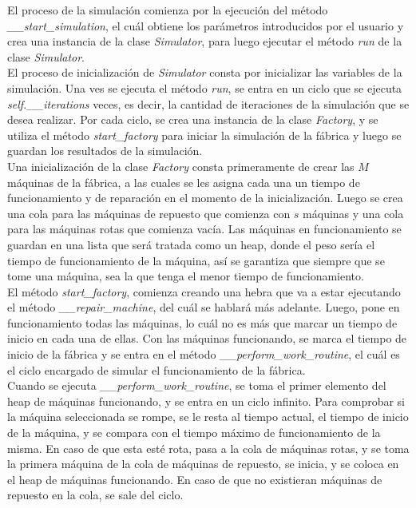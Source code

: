\documentclass{article}
\begin{document}
El proceso de la simulación comienza por la ejecución del método \textit{\_\_start\_simulation}, el cuál obtiene los parámetros introducidos por el usuario y crea una instancia de la clase \textit{Simulator}, para luego ejecutar el método \textit{run} de la clase \textit{Simulator}.\\

El proceso de inicialización de \textit{Simulator} consta por inicializar las variables de la simulación. Una ves se ejecuta el método \textit{run}, se entra en un ciclo que se ejecuta \textit{self.\_\_iterations} veces, es decir, la cantidad de iteraciones de la simulación que se desea realizar. Por cada ciclo, se crea una instancia de la clase \textit{Factory}, y se utiliza el método \textit{start\_factory} para iniciar la simulación de la fábrica y luego se guardan los resultados de la simulación.\\

Una inicialización de la clase \textit{Factory} consta primeramente de crear las $M$ máquinas de la fábrica, a las cuales se les asigna cada una un tiempo de funcionamiento y de reparación en el momento de la inicialización. Luego se crea una cola para las máquinas de repuesto que comienza con $s$ máquinas y una cola para las máquinas rotas que comienza vacía. Las máquinas en funcionamiento se guardan en una lista que será tratada como un heap, donde el peso sería el tiempo de funcionamiento de la máquina, así se garantiza que siempre que se tome una máquina, sea la que tenga el menor tiempo de funcionamiento.\\

El método \textit{start\_factory}, comienza creando una hebra que va a estar ejecutando el método \textit{\_\_repair\_machine}, del cuál se hablará más adelante. Luego, pone en funcionamiento todas las máquinas, lo cuál no es más que marcar un tiempo de inicio en cada una de ellas. Con las máquinas funcionando, se marca el tiempo de inicio de la fábrica y se entra en el método \textit{\_\_perform\_work\_routine}, el cuál es el ciclo encargado de simular el funcionamiento de la fábrica.\\

Cuando se ejecuta \textit{\_\_perform\_work\_routine}, se toma el primer elemento del heap de máquinas funcionando, y se entra en un ciclo infinito. Para comprobar si la máquina seleccionada se rompe, se le resta al tiempo actual, el tiempo de inicio de la máquina, y se compara con el tiempo máximo de funcionamiento de la misma. En caso de que esta esté rota, pasa a la cola de máquinas rotas, y se toma la primera máquina de la cola de máquinas de repuesto, se inicia, y se coloca en el heap de máquinas funcionando. En caso de que no existieran máquinas de repuesto en la cola, se sale del ciclo.\\
\end{document}
